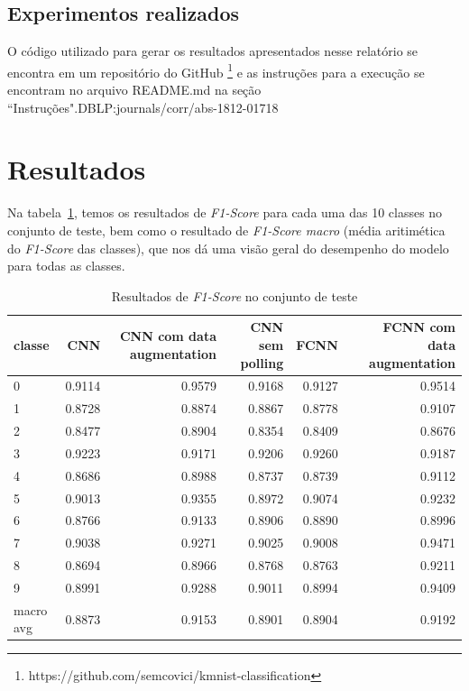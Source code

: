 \documentclass[12pt]{article}
\begin{document}
\subsection{Experimentos realizados}

O código utilizado para gerar os resultados apresentados nesse relatório se encontra em um repositório do GitHub \footnote{https://github.com/semcovici/kmnist-classification} e as instruções para a execução se encontram no arquivo README.md na seção ``Instruções".DBLP:journals/corr/abs-1812-01718


\section{Resultados}

Na tabela~\ref{table:results_f1}, temos os resultados de \textit{F1-Score} para cada uma das 10 classes no conjunto de teste, bem como o resultado de \textit{F1-Score macro} (média aritimética do \textit{F1-Score} das classes), que nos dá uma visão geral do desempenho do modelo para todas as classes.

\begin{table}[H]\scriptsize\centering
  \begin{tabular}{l|rrrrr}
    \toprule
    classe & CNN & CNN com data augmentation & CNN sem polling & FCNN & FCNN com data augmentation \\
    \midrule
    0 & 0.9114 & 0.9579 & 0.9168 & 0.9127 & 0.9514 \\
    1 & 0.8728 & 0.8874 & 0.8867 & 0.8778 & 0.9107 \\
    2 & 0.8477 & 0.8904 & 0.8354 & 0.8409 & 0.8676 \\
    3 & 0.9223 & 0.9171 & 0.9206 & 0.9260 & 0.9187 \\
    4 & 0.8686 & 0.8988 & 0.8737 & 0.8739 & 0.9112 \\
    5 & 0.9013 & 0.9355 & 0.8972 & 0.9074 & 0.9232 \\
    6 & 0.8766 & 0.9133 & 0.8906 & 0.8890 & 0.8996 \\
    7 & 0.9038 & 0.9271 & 0.9025 & 0.9008 & 0.9471 \\
    8 & 0.8694 & 0.8966 & 0.8768 & 0.8763 & 0.9211 \\
    9 & 0.8991 & 0.9288 & 0.9011 & 0.8994 & 0.9409 \\
    \midrule
    macro avg & 0.8873 & 0.9153 & 0.8901 & 0.8904 & 0.9192 \\
    \bottomrule
    \end{tabular}
    
\caption{Resultados de \textit{F1-Score} no conjunto de teste}
\label{table:results_f1}
\end{table}
\end{document}
